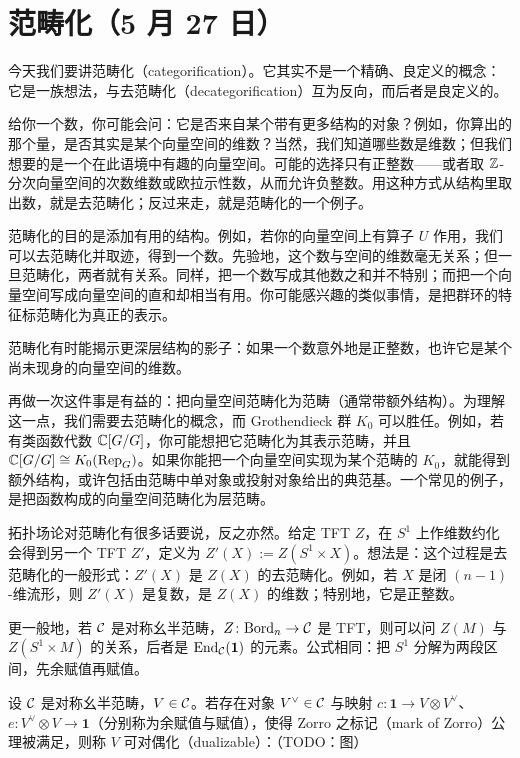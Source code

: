 \section[范畴化]{范畴化（5 月 27 日）}


今天我们要讲范畴化（categorification）。它其实不是一个精确、良定义的概念：它是一族想法，与去范畴化（decategorification）互为反向，而后者是良定义的。

给你一个数，你可能会问：它是否来自某个带有更多结构的对象？例如，你算出的那个量，是否其实是某个向量空间的维数？当然，我们知道哪些数是维数；但我们想要的是一个在此语境中有趣的向量空间。可能的选择只有正整数——或者取 $\mathbb{Z}$-分次向量空间的次数维数或欧拉示性数，从而允许负整数。用这种方式从结构里取出数，就是去范畴化；反过来走，就是范畴化的一个例子。

范畴化的目的是添加有用的结构。例如，若你的向量空间上有算子 $U$ 作用，我们可以去范畴化并取迹，得到一个数。先验地，这个数与空间的维数毫无关系；但一旦范畴化，两者就有关系。同样，把一个数写成其他数之和并不特别；而把一个向量空间写成向量空间的直和却相当有用。你可能感兴趣的类似事情，是把群环的特征标范畴化为真正的表示。

范畴化有时能揭示更深层结构的影子：如果一个数意外地是正整数，也许它是某个尚未现身的向量空间的维数。


再做一次这件事是有益的：把向量空间范畴化为范畴（通常带额外结构）。为理解这一点，我们需要去范畴化的概念，而 Grothendieck 群 $K_0$ 可以胜任。例如，若有类函数代数 $\mathbb{C}[G/G]$，你可能想把它范畴化为其表示范畴，并且 $\mathbb{C}[G/G]\cong K_0(\operatorname{Rep}_G)$。如果你能把一个向量空间实现为某个范畴的 $K_0$，就能得到额外结构，或许包括由范畴中单对象或投射对象给出的典范基。一个常见的例子，是把函数构成的向量空间范畴化为层范畴。

拓扑场论对范畴化有很多话要说，反之亦然。给定 TFT $Z$，在 $S^1$ 上作维数约化会得到另一个 TFT $Z'$，定义为 $Z'(X):=Z(S^1\times X)$。想法是：这个过程是去范畴化的一般形式：$Z'(X)$ 是 $Z(X)$ 的去范畴化。例如，若 $X$ 是闭 $(n-1)$-维流形，则 $Z'(X)$ 是复数，是 $Z(X)$ 的维数；特别地，它是正整数。

更一般地，若 $\mathcal{C}$ 是对称幺半范畴，$Z\colon\mathrm{Bord}_n\to\mathcal{C}$ 是 TFT，则可以问 $Z(M)$ 与 $Z(S^1\times M)$ 的关系，后者是 $\operatorname{End}_{\mathcal{C}}(\mathbf{1})$ 的元素。公式相同：把 $S^1$ 分解为两段区间，先余赋值再赋值。

\begin{definition}
设 $\mathcal{C}$ 是对称幺半范畴，$V\in\mathcal{C}$。若存在对象 $V^\vee\in\mathcal{C}$ 与映射 $c\colon\mathbf{1}\to V\otimes V^\vee$、$e\colon V^\vee\otimes V\to\mathbf{1}$（分别称为余赋值与赋值），使得 Zorro 之标记（mark of Zorro）公理被满足，则称 $V$ 可对偶化（dualizable）：（TODO：图）
\end{definition}


